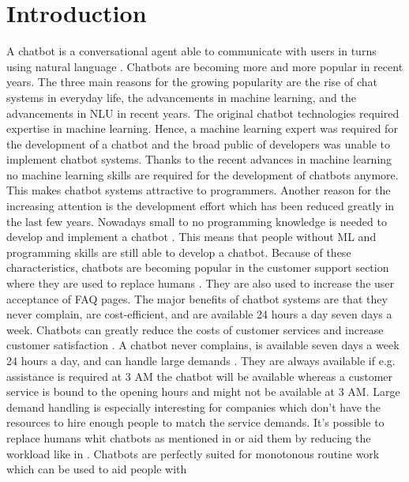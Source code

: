 \section{Introduction} %
A chatbot is a conversational agent able to communicate with users in turns 
using natural language \cite{evaluateChatbotsShawar2007, shawar2007chatbots, huang2007extracting, gregori2017evaluation}.
Chatbots are becoming more and more popular in recent years.
The three main reasons for the growing popularity are the rise of chat systems in everyday life, 
the advancements in machine learning, and the advancements in NLU in recent years. \cite{braunEvaluatingNLU}
The original chatbot technologies required expertise in machine learning.
Hence, a machine learning expert was required for the development of a chatbot and the broad public 
of developers was unable to implement chatbot systems.
Thanks to the recent advances in machine learning no machine learning skills are required for the development of chatbots anymore.
This makes chatbot systems attractive to programmers. 
Another reason for the increasing attention is the development effort which has been reduced greatly in the last few years.
Nowadays small to no programming knowledge is needed to develop and implement a chatbot \cite{braunEvaluatingNLU}.
This means that people without ML and programming skills are still able to develop a chatbot.
Because of these characteristics, chatbots are becoming popular in the customer support section where they are used to replace humans \cite{GO2019304}.
They are also used to increase the user acceptance of FAQ pages.
The major benefits of chatbot systems are that they never complain, are cost-efficient, and are available 24 hours a day
seven days a week.
Chatbots can greatly reduce the costs of customer services and increase customer satisfaction \cite{singhbuilding}. 
A chatbot never complains, is available seven days a week 24 hours a day, and can handle large 
demands \cite{singhbuilding}.
They are always available if e.g. assistance is required at 3 AM the chatbot will be available whereas a 
customer service is bound to the opening hours and might not be available at 3 AM.
Large demand handling is especially interesting for companies which don't have the resources to 
hire enough people to match the service demands.
It's possible to replace humans whit chatbots as mentioned in \citet{rahman2017programming}
or aid them by reducing the workload like in \citet{deshpande2017survey}.
Chatbots are perfectly suited for monotonous routine work which can be used to aid people with 
